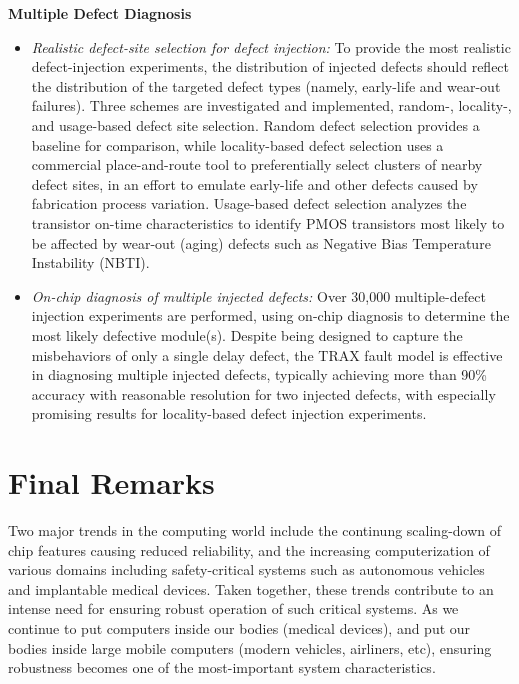\textbf{Multiple Defect Diagnosis}
\begin{itemize}
\item{\textit{Realistic defect-site selection for defect injection:} To provide the most realistic defect-injection experiments, the distribution of injected defects should reflect the distribution of the targeted defect types (namely, early-life and wear-out failures).
%
Three schemes are investigated and implemented, random-, locality-, and usage-based defect site selection.
%
Random defect selection provides a baseline for comparison, while locality-based defect selection uses a commercial place-and-route tool to preferentially select clusters of nearby defect sites, in an effort to emulate early-life and other defects caused by fabrication process variation.
%
Usage-based defect selection analyzes the transistor on-time characteristics to identify PMOS transistors most likely to be affected by wear-out (aging) defects such as Negative Bias Temperature Instability (NBTI).}
\item{\textit{On-chip diagnosis of multiple injected defects:} Over 30,000 multiple-defect injection experiments are performed, using on-chip diagnosis to determine the most likely defective module(s).
%
Despite being designed to capture the misbehaviors of only a single delay defect, the TRAX fault model is effective in diagnosing multiple injected defects, typically achieving more than 90\% accuracy with reasonable resolution for two injected defects, with especially promising results for locality-based defect injection experiments.}
\end{itemize}


\section{Final Remarks}
\label{sec:conclusions_concluding_remarks}

Two major trends in the computing world include the continung scaling-down of chip features causing reduced reliability, and the increasing computerization of various domains including safety-critical systems such as autonomous vehicles and implantable medical devices.
%
Taken together, these trends contribute to an intense need for ensuring robust operation of such critical systems.
%
As we continue to put computers inside our bodies (medical devices), and put our bodies inside large mobile computers (modern vehicles, airliners, etc), ensuring robustness becomes one of the most-important system characteristics.

